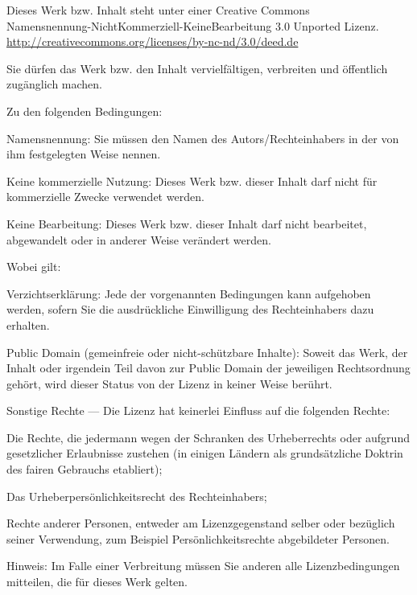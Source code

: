 \vspace*{-2.5\baselineskip}
\enlargethispage{\baselineskip}

{\fontsize{7}{9}\selectfont\setlength{\parindent}{0pt}%
\raggedright\label{copyright-details}
\setlength{\parskip}{3pt}
{\centering

{\large\ccbyncnd}

Dieses Werk bzw. Inhalt steht unter einer Creative Commons\\
Namensnennung-NichtKommerziell-KeineBearbeitung 3.0 Unported Lizenz.\\
\href{http://creativecommons.org/licenses/by-nc-nd/3.0/deed.de}{http://creativecommons.org/licenses/by-nc-nd/3.0/deed.de}

}

\bigskip

Sie dürfen das Werk bzw. den Inhalt vervielfältigen, verbreiten und öffentlich zugänglich machen.

Zu den folgenden Bedingungen: 

\begin{packeditemize}
\item Namensnennung: Sie müssen den Namen des Autors/Rechteinhabers in der von ihm festgelegten Weise nennen.
\item Keine kommerzielle Nutzung: Dieses Werk bzw. dieser Inhalt darf nicht für kommerzielle Zwecke verwendet werden.
\item Keine Bearbeitung: Dieses Werk bzw. dieser Inhalt darf nicht bearbeitet, abgewandelt oder in anderer Weise verändert werden.
\end{packeditemize}

Wobei gilt: 

\begin{packeditemize}
\item Verzichtserklärung: Jede der vorgenannten Bedingungen kann aufgehoben werden, sofern Sie die ausdrückliche Einwilligung des Rechteinhabers dazu erhalten. 
\item Public Domain (gemeinfreie oder nicht-schützbare Inhalte): Soweit das Werk, der Inhalt oder irgendein Teil davon zur Public Domain der jeweiligen Rechtsordnung gehört, wird dieser Status von der Lizenz in keiner Weise berührt. 
\item Sonstige Rechte — Die Lizenz hat keinerlei Einfluss auf die folgenden Rechte: 
  \begin{packeditemize}
    \item Die Rechte, die jedermann wegen der Schranken des Urheberrechts oder aufgrund gesetzlicher Erlaubnisse zustehen (in einigen Ländern als grundsätzliche Doktrin des fairen Gebrauchs etabliert); 
    \item Das Urheberpersönlichkeitsrecht des Rechteinhabers; 
    \item Rechte anderer Personen, entweder am Lizenzgegenstand selber oder bezüglich seiner Verwendung, zum Beispiel Persönlichkeitsrechte abgebildeter Personen. 
  \end{packeditemize}
\item Hinweis: Im Falle einer Verbreitung müssen Sie anderen alle Lizenzbedingungen mitteilen, die für dieses Werk gelten. 
\end{packeditemize}

}
